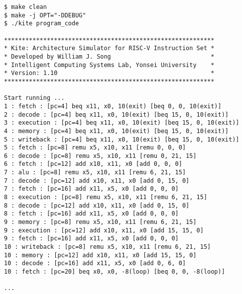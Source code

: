 \documentclass[10pt]{article}
\begin{document}
\begin{Verbatim}[frame=single]
$ make clean
$ make -j OPT="-DDEBUG" 
$ ./kite program_code

***********************************************************
* Kite: Architecture Simulator for RISC-V Instruction Set *
* Developed by William J. Song                            *
* Intelligent Computing Systems Lab, Yonsei University    *
* Version: 1.10                                           *
***********************************************************

Start running ...
1 : fetch : [pc=4] beq x11, x0, 10(exit) [beq 0, 0, 10(exit)]
2 : decode : [pc=4] beq x11, x0, 10(exit) [beq 15, 0, 10(exit)]
3 : execution : [pc=4] beq x11, x0, 10(exit) [beq 15, 0, 10(exit)]
4 : memory : [pc=4] beq x11, x0, 10(exit) [beq 15, 0, 10(exit)]
5 : writeback : [pc=4] beq x11, x0, 10(exit) [beq 15, 0, 10(exit)]
5 : fetch : [pc=8] remu x5, x10, x11 [remu 0, 0, 0]
6 : decode : [pc=8] remu x5, x10, x11 [remu 0, 21, 15]
6 : fetch : [pc=12] add x10, x11, x0 [add 0, 0, 0]
7 : alu : [pc=8] remu x5, x10, x11 [remu 6, 21, 15]
7 : decode : [pc=12] add x10, x11, x0 [add 0, 15, 0]
7 : fetch : [pc=16] add x11, x5, x0 [add 0, 0, 0]
8 : execution : [pc=8] remu x5, x10, x11 [remu 6, 21, 15]
8 : decode : [pc=12] add x10, x11, x0 [add 0, 15, 0]
8 : fetch : [pc=16] add x11, x5, x0 [add 0, 0, 0]
9 : memory : [pc=8] remu x5, x10, x11 [remu 6, 21, 15]
9 : execution : [pc=12] add x10, x11, x0 [add 15, 15, 0]
9 : fetch : [pc=16] add x11, x5, x0 [add 0, 0, 0]
10 : writeback : [pc=8] remu x5, x10, x11 [remu 6, 21, 15]
10 : memory : [pc=12] add x10, x11, x0 [add 15, 15, 0]
10 : decode : [pc=16] add x11, x5, x0 [add 0, 6, 0]
10 : fetch : [pc=20] beq x0, x0, -8(loop) [beq 0, 0, -8(loop)]

...
\end{Verbatim}
\end{document}
